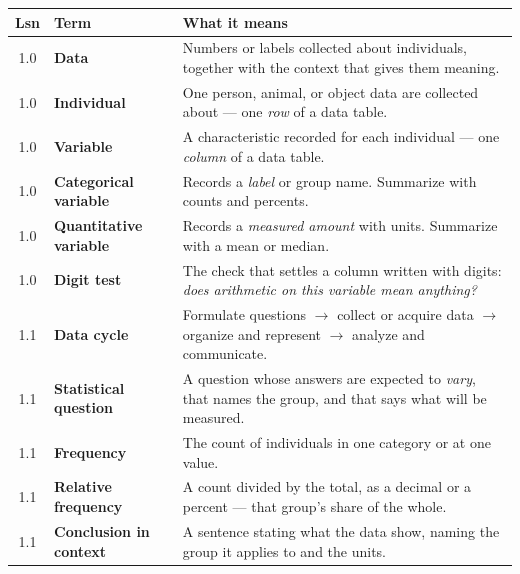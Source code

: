 \documentclass[10pt]{article}
\begin{document}
\vspace{3pt}
\renewcommand{\arraystretch}{1.22}
\begin{tabularx}{\linewidth}{@{} c >{\bfseries}p{3.0cm} X @{}}
\rowcolor{frost}
\textbf{Lsn} & \textbf{Term} & \textbf{What it means} \\
\midrule
1.0 & Data & Numbers or labels collected about individuals, together with the
      context that gives them meaning. \\
1.0 & Individual & One person, animal, or object data are collected about --- one
      \emph{row} of a data table. \\
1.0 & Variable & A characteristic recorded for each individual --- one
      \emph{column} of a data table. \\
1.0 & Categorical variable & Records a \emph{label} or group name. Summarize with
      counts and percents. \\
1.0 & Quantitative variable & Records a \emph{measured amount} with units.
      Summarize with a mean or median. \\
1.0 & Digit test & The check that settles a column written with digits:
      \emph{does arithmetic on this variable mean anything?} \\
1.1 & Data cycle & Formulate questions $\rightarrow$ collect or acquire data
      $\rightarrow$ organize and represent $\rightarrow$ analyze and communicate. \\
1.1 & Statistical question & A question whose answers are expected to
      \emph{vary}, that names the group, and that says what will be measured. \\
1.1 & Frequency & The count of individuals in one category or at one value. \\
1.1 & Relative frequency & A count divided by the total, as a decimal or a
      percent --- that group's share of the whole. \\
1.1 & Conclusion in context & A sentence stating what the data show, naming the
      group it applies to and the units. \\
\end{tabularx}
\end{document}
